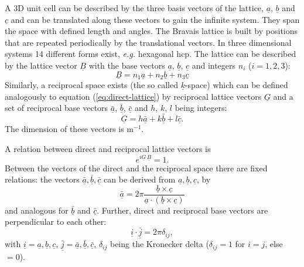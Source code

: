 \documentclass[11pt,DIV=13,BCOR=5mm,a4paper,headinclude]{scrbook}
\renewcommand{\vec}[1]{\underline{#1}}
\begin{document}
A 3D unit cell can be described by the three basis vectors of the lattice, $\vec{a}$, $\vec{b}$ and $\vec{c}$ and can be translated along these vectors to gain the infinite system\cite{jensen}.
They span the space with defined length and angles.
The Bravais lattice is built by positions that are repeated periodically by the translational vectors.
In three dimensional systems 14 different forms exist, \textit{e.g.} hexagonal hcp.
The lattice can be described by the lattice vector $\vec{B}$ with the base vectors $\vec{a}$, $\vec{b}$, $\vec{c}$ and integers $n_i$ ($i=1,2,3$):
\begin{equation}\label{eq:direct-lattice}
 \vec{B}=n_1\vec{a}+n_2\vec{b}+n_3\vec{c}
\end{equation}
Similarly, a reciprocal space exists (the so called $\vec{k}$-space) which can be defined analogously to equation (\ref{eq:direct-lattice}) by reciprocal lattice vectors $\vec{G}$ and a set of reciprocal base vectors $\bar{\vec{a}}$, $\bar{\vec{b}}$, $\bar{\vec{c}}$ and $h$, $k$, $l$ being integers:
\begin{equation}\label{eq:rec_latt_vec}
 \vec{G}=h\bar{\vec{a}}+k\bar{\vec{b}}+l\bar{\vec{c}}.
\end{equation}
The dimension of these vectors is m$^{-1}$.

A relation between direct and reciprocal lattice vectors is
\begin{equation}
 e^{i\vec{G}\,\vec{B}}=1.
\end{equation}
Between the vectors of the direct and the reciprocal space there are fixed relations: the vectors $\bar{\vec{a}},\bar{\vec{b}},\bar{\vec{c}}$  can be derived from $\vec{a},\vec{b},\vec{c}$, by
\begin{equation}
\bar{\vec{a}}=2\pi\frac{\vec{b} \times \vec{c}}{\vec{a}\cdot(\vec{b} \times \vec{c})} 
\end{equation}
and analogous for $\bar{\vec{b}}$ and $\bar{\vec{c}}$.
Further, direct and reciprocal base vectors are perpendicular to each other:
\begin{equation}
 \vec{i}\cdot\bar{\vec{j}}=2\pi\delta_{ij},
\end{equation} 
with $\vec{i}=\vec{a}, \vec{b}, \vec{c}$, $\bar{\vec{j}}=\bar{\vec{a}},\bar{\vec{b}},\bar{\vec{c}}$, $\delta_{ij}$ being the Kronecker delta ($\delta_{ij}=1$ for $i=j$, else $=0$).
\end{document}
